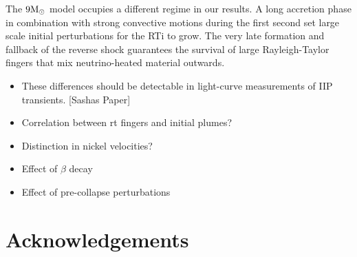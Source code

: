\documentclass[fleqn,usenatbib]{mnras}
\newcommand{\solm}{\xspace\ensuremath{\rm{M_{\odot}}}\xspace}
\newcommand{\COM}[1]{{\color{orange}#1}}
\begin{document}
The $9\solm$ model occupies a different regime in our results. A long accretion phase in combination with strong convective motions during the first second set large scale initial perturbations for the RTi to grow. The very late formation and fallback of the reverse shock guarantees the survival of large Rayleigh-Taylor fingers that mix neutrino-heated material outwards. 


\begin{itemize}
    \item \COM{These differences should be detectable in light-curve measurements of IIP transients. [Sashas Paper]}
    \item \COM{Correlation between rt fingers and initial plumes?}
    \item \COM{Distinction in nickel velocities?}
    \item \COM{Effect of $\beta$ decay}
    \item \COM{Effect of pre-collapse perturbations}
\end{itemize}

\section*{Acknowledgements}
\end{document}
